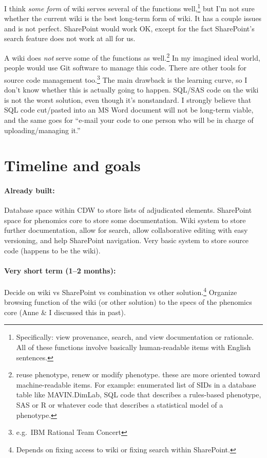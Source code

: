 \documentclass{tufte-handout}
\begin{document}
I think \emph{some form} of wiki serves several of the functions well,\footnote{Specifically: view provenance, search, and view documentation or
rationale. All of these functions involve basically human-readable
items with English sentences.} but I'm
not sure whether the current wiki is the best long-term form of wiki. It has a
couple issues and is not perfect. SharePoint would work OK, except for the fact SharePoint's
search feature does not work at all for us.

A wiki does \emph{not} serve some of the functions as well.\footnote{reuse phenotype, renew or modify phenotype. these are
more oriented toward machine-readable items. For example: enumerated list of SIDs
in a database table like MAVIN.DimLab, SQL code that describes a
rules-based phenotype, SAS or R or whatever code that describes a
statistical model of a phenotype.} In my imagined ideal world,
people would use Git software to manage this code. There are other
tools for source code management too.\footnote{e.g.\ IBM Rational Team Concert}
The main drawback is the learning curve, so I don't know whether this
is actually going to happen. SQL/SAS code on the wiki is not the worst
solution, even though it's nonstandard. I strongly believe that SQL
code cut/pasted into an MS Word document will not be long-term viable,
and the same goes for ``e-mail your code to one person who will be in
charge of uploading/managing it.''

\section{Timeline and goals}

\paragraph{Already built:} Database space within CDW to store lists of adjudicated elements.
SharePoint space for phenomics core to store some documentation. Wiki
system to store further documentation, allow for search, allow
collaborative editing with easy versioning, and help SharePoint
navigation. Very basic system to store source code (happens to be the
wiki).

\paragraph{Very short term (1--2 months):} Decide on wiki vs SharePoint vs combination vs other solution.\footnote{Depends
on fixing access to wiki or fixing search within SharePoint.} Organize
browsing function of the wiki (or other solution) to the specs of the
phenomics core (Anne \& I discussed this in past).
\end{document}
